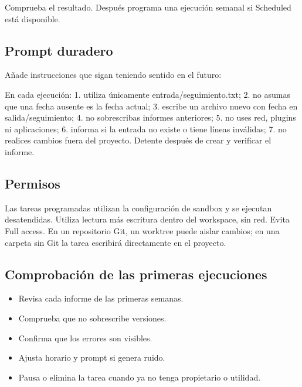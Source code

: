 \documentclass[10pt,a4paper,openany]{book}
\providecommand{\tightlist}{\setlength{\itemsep}{0.18em}\setlength{\parskip}{0pt}}
\newenvironment{Shaded}{}{}
\newcommand{\NormalTok}[1]{#1}
\renewenvironment{Shaded}
  {\begin{tcolorbox}[
    enhanced,
    breakable,
    colback=CodeBg,
    colframe=Border,
    boxrule=0.5pt,
    arc=2mm,
    left=3mm,
    right=3mm,
    top=2.2mm,
    bottom=2.2mm,
    before skip=0.8em,
    after skip=0.9em
  ]}
  {\end{tcolorbox}}
\begin{document}
Comprueba el resultado. Después programa una ejecución semanal si
Scheduled está disponible.

\subsection{Prompt duradero}\label{prompt-duradero}

Añade instrucciones que sigan teniendo sentido en el futuro:

\begin{Shaded}
\begin{Highlighting}[]
\NormalTok{En cada ejecución:}
\NormalTok{1. utiliza únicamente entrada/seguimiento.txt;}
\NormalTok{2. no asumas que una fecha ausente es la fecha actual;}
\NormalTok{3. escribe un archivo nuevo con fecha en salida/seguimiento;}
\NormalTok{4. no sobrescribas informes anteriores;}
\NormalTok{5. no uses red, plugins ni aplicaciones;}
\NormalTok{6. informa si la entrada no existe o tiene líneas inválidas;}
\NormalTok{7. no realices cambios fuera del proyecto.}
\NormalTok{Detente después de crear y verificar el informe.}
\end{Highlighting}
\end{Shaded}

\subsection{Permisos}\label{permisos}

Las tareas programadas utilizan la configuración de sandbox y se
ejecutan desatendidas. Utiliza lectura más escritura dentro del
workspace, sin red. Evita Full access. En un repositorio Git, un
worktree puede aislar cambios; en una carpeta sin Git la tarea escribirá
directamente en el proyecto.

\subsection{Comprobación de las primeras
ejecuciones}\label{comprobaciuxf3n-de-las-primeras-ejecuciones}

\begin{itemize}
\tightlist
\item
  Revisa cada informe de las primeras semanas.
\item
  Comprueba que no sobrescribe versiones.
\item
  Confirma que los errores son visibles.
\item
  Ajusta horario y prompt si genera ruido.
\item
  Pausa o elimina la tarea cuando ya no tenga propietario o utilidad.
\end{itemize}
\end{document}
